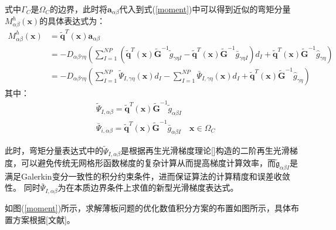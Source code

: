 式中$\Gamma_C$是$\Omega_C$的边界，此时将$\pmb{a}_{\alpha\beta}$代入到式(\ref{moment})中可以得到近似的弯矩分量$M^h_{\alpha\beta}(\pmb{x})$的具体表达式为：
\begin{equation}
\begin{split}
M^h_{\alpha\beta}(\pmb{x})&=\tilde{\pmb{q}}^T(\pmb{x})\pmb a_{\alpha\beta}\\
&=-D_{\alpha\beta\gamma\eta}(\sum_{I=1}^{N\!P}(\tilde{\pmb q}^T(\pmb x)\tilde{\pmb G}^{-1}\tilde{g}_{\gamma\eta I}-\tilde{\pmb q}^T(\pmb x)\tilde{\pmb G}^{-1}\bar{g}_{\gamma\eta I})d_I+\tilde{\pmb q}^T(\pmb x)\tilde{\pmb G}^{-1}\hat{g}_{\gamma\eta})\\
&=-D_{\alpha\beta\gamma\eta}(\sum_{I=1}^{N\!P}\tilde{\Psi}_{I,\gamma\eta}(\pmb x)d_I-\sum_{I=1}^{N\!P}\bar{\Psi}_{I,\gamma\eta}(\pmb{x})d_I+\tilde{\pmb q}^T(\pmb x)\tilde{\pmb G}^{-1}\hat{g}_{\gamma\eta})
\end{split}
\end{equation}
其中：
\begin{align}
 \label{PTPSI}&\tilde{\Psi}_{I,\alpha\beta}=\tilde{\pmb q}^T(\pmb x)\tilde{\pmb G}^{-1}\tilde{g}_{\alpha\beta I}\\
 \label{PBPSI}&\bar{\Psi}_{i,\alpha\beta}=\tilde{\pmb q}^T(\pmb x)\tilde{\pmb G}^{-1}\bar{g}_{\alpha\beta I}\quad \pmb{x}\in\Omega_C
\end{align}\par
此时，弯矩分量表达式中的$\tilde{\Psi}_{I,\alpha\beta}$是根据再生光滑梯度理论[]构造的二阶再生光滑梯度，可以避免传统无网格形函数梯度的复杂计算从而提高梯度计算效率，而$\tilde{\mathfrak{g}}_{\alpha\beta I}$是满足Galerkin变分一致性的积分约束条件，进而保证算法的计算精度和误差收敛性。
同时$\bar{\Psi}_{I,\alpha\beta}$为在本质边界条件上求值的新型光滑梯度表达式。\par
如图(\ref{moment})所示，求解薄板问题的优化数值积分方案的布置如图所示，具体布置方案根据[文献]。
